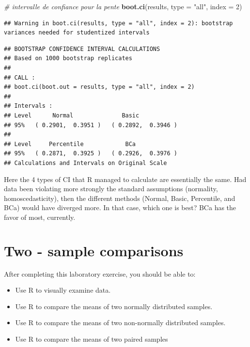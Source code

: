 \documentclass[
  12pt,
]{book}
\newenvironment{Shaded}{\begin{snugshade}}{\end{snugshade}}
\newcommand{\CommentTok}[1]{\textcolor[rgb]{0.56,0.35,0.01}{\textit{#1}}}
\newcommand{\DataTypeTok}[1]{\textcolor[rgb]{0.13,0.29,0.53}{#1}}
\newcommand{\DecValTok}[1]{\textcolor[rgb]{0.00,0.00,0.81}{#1}}
\newcommand{\KeywordTok}[1]{\textcolor[rgb]{0.13,0.29,0.53}{\textbf{#1}}}
\newcommand{\NormalTok}[1]{#1}
\newcommand{\StringTok}[1]{\textcolor[rgb]{0.31,0.60,0.02}{#1}}
\providecommand{\tightlist}{%
  \setlength{\itemsep}{0pt}\setlength{\parskip}{0pt}}
\begin{document}
\begin{Shaded}
\begin{Highlighting}[]
\CommentTok{\# intervalle de confiance pour la pente}
\KeywordTok{boot.ci}\NormalTok{(results, }\DataTypeTok{type =} \StringTok{"all"}\NormalTok{, }\DataTypeTok{index =} \DecValTok{2}\NormalTok{)}
\end{Highlighting}
\end{Shaded}

\begin{verbatim}
## Warning in boot.ci(results, type = "all", index = 2): bootstrap variances needed for studentized intervals
\end{verbatim}

\begin{verbatim}
## BOOTSTRAP CONFIDENCE INTERVAL CALCULATIONS
## Based on 1000 bootstrap replicates
## 
## CALL : 
## boot.ci(boot.out = results, type = "all", index = 2)
## 
## Intervals : 
## Level      Normal              Basic         
## 95%   ( 0.2901,  0.3951 )   ( 0.2892,  0.3946 )  
## 
## Level     Percentile            BCa          
## 95%   ( 0.2871,  0.3925 )   ( 0.2926,  0.3976 )  
## Calculations and Intervals on Original Scale
\end{verbatim}

Here the 4 types of CI that R managed to calculate are essentially the same. Had data been violating more strongly the standard assumptions (normality, homoscedasticity), then the different methods (Normal, Basic, Percentile, and BCa) would have diverged more. In that case, which one is best? BCa has the favor of most, currently.

\hypertarget{two---sample-comparisons}{%
\chapter{Two - sample comparisons}\label{two---sample-comparisons}}

After completing this laboratory exercise, you should be able to:

\begin{itemize}
\tightlist
\item
  Use R to visually examine data.
\item
  Use R to compare the means of two normally distributed samples.
\item
  Use R to compare the means of two non-normally distributed
  samples.
\item
  Use R to compare the means of two paired samples
\end{itemize}
\end{document}
